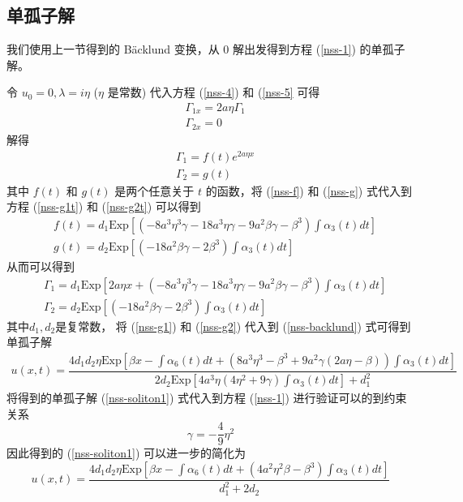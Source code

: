 \subsection{单孤子解}
我们使用上一节得到的 B\"acklund 变换，从 0 解出发得到方程 (\ref{nss-1}) 的单孤子解。

令 $u_{0} = 0, \lambda = i\eta$ ($\eta$ 是常数) 代入方程 (\ref{nss-4}) 和 (\ref{nss-5} 可得
\begin{align}
  & \Gamma_{1x} = 2a\eta\Gamma_{1} \\
  & \Gamma_{2x} = 0
\end{align}
解得
\begin{align}
  & \Gamma_{1} = f(t)e^{2a\eta x} \label{nss-f} \\
  & \Gamma_{2} = g(t)  \label{nss-g}
\end{align}
其中 $f(t)$ 和 $g(t)$ 是两个任意关于  $t$ 的函数，将 (\ref{nss-f}) 和 (\ref{nss-g}) 式代入到方程 (\ref{nss-g1t}) 和 (\ref{nss-g2t}) 可以得到
\begin{align}
  & f(t) = d_{1}\mathrm{Exp}\left[\left(-8a^3\eta^3\gamma-18a^3\eta \gamma-9a^2\beta \gamma - \beta^3\right)\int \alpha_{3}(t)dt\right] \\
  & g(t) = d_{2}\mathrm{Exp}\left[\left(-18a^2\beta \gamma-2\beta^3\right)\int \alpha_{3}(t)dt\right]
\end{align}
从而可以得到
\begin{align}
  & \Gamma_{1} = d_{1}\mathrm{Exp}\left[2a\eta x + \left(-8a^3\eta^3\gamma-18a^3\eta \gamma-9a^2\beta \gamma - \beta^3\right)\int \alpha_{3}(t)dt\right]  \label{nss-g1} \\
  & \Gamma_{2} = d_{2}\mathrm{Exp}\left[\left(-18a^2\beta \gamma-2\beta^3\right)\int \alpha_{3}(t)dt\right]  \label{nss-g2}
\end{align}
其中$d_{1}, d_{2}$是复常数， 将  (\ref{nss-g1}) 和  (\ref{nss-g2}) 代入到  (\ref{nss-backlund}) 式可得到单孤子解
\begin{align}
    u(x,t) = \dfrac{4d_1d_2\eta\mathrm{Exp}\left[\beta x - \int \alpha_6(t)dt + (8a^3\eta^3-\beta^3+9a^2\gamma(2a\eta-\beta))\int \alpha_3(t)dt\right]}{2d_2 \mathrm{Exp}\left[4a^3\eta(4\eta^2+9\gamma)\int \alpha_3(t)dt\right] + d_1^2} \label{nss-soliton1}
\end{align}
将得到的单孤子解 (\ref{nss-soliton1}) 式代入到方程 (\ref{nss-1}) 进行验证可以的到约束关系
\begin{equation}
  \gamma = -\dfrac{4}{9}\eta^2
\end{equation}
因此得到的 (\ref{nss-soliton1}) 可以进一步的简化为
\begin{equation}
  u(x,t) = \frac{4d_1d_2\eta \mathrm{Exp}\left[\beta x - \int \alpha_6(t)dt + (4a^2\eta^2\beta - \beta^3)\int \alpha_3(t)dt\right]}{d_1^2 + 2d_2} \label{nss-soliton2}
\end{equation}

